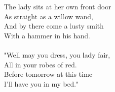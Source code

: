 \documentclass[twoside,13pt,openany,letterpaper]{memoir}%
\begin{document}
\begin{multicols}{2}[
]
The lady sits at her own front door\\
As straight as a willow wand,\\
And by there come a lusty smith\\
With a hammer in his hand.\\
\\
"Well may you dress, you lady fair,\\
All in your robes of red.\\
Before tomorrow at this time\\
I'll have you in my bed."\\



\end{multicols}
\end{document}
